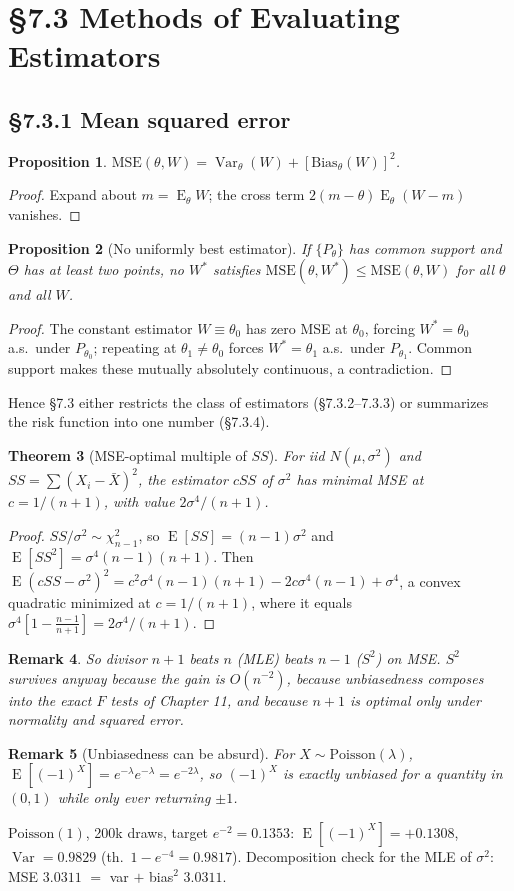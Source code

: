 \documentclass[11pt]{article}
\newtheorem{theorem}{Theorem}[section]
\newtheorem{remark}[theorem]{Remark}
\newtheorem{proposition}[theorem]{Proposition}
\DeclareMathOperator{\Var}{Var}\DeclareMathOperator{\Cov}{Cov}\DeclareMathOperator{\E}{E}
\newcommand{\MSE}{\mathrm{MSE}}
\begin{document}
\section{\S7.3 Methods of Evaluating Estimators}
\subsection{\S7.3.1 Mean squared error}
\begin{proposition}
$\MSE(\theta,W)=\Var_\theta(W)+[\mathrm{Bias}_\theta(W)]^2$.
\end{proposition}
\begin{proof}
Expand about $m=\E_\theta W$; the cross term $2(m-\theta)\E_\theta(W-m)$ vanishes.
\end{proof}
\begin{proposition}[No uniformly best estimator]
If $\{P_\theta\}$ has common support and $\Theta$ has at least two points, no $W^*$ satisfies $\MSE(\theta,W^*)\le\MSE(\theta,W)$ for all $\theta$ and all $W$.
\end{proposition}
\begin{proof}
The constant estimator $W\equiv\theta_0$ has zero MSE at $\theta_0$, forcing $W^*=\theta_0$ a.s.\ under $P_{\theta_0}$; repeating at $\theta_1\ne\theta_0$ forces $W^*=\theta_1$ a.s.\ under $P_{\theta_1}$. Common support makes these mutually absolutely continuous, a contradiction.
\end{proof}
Hence \S7.3 either restricts the class of estimators (\S7.3.2--7.3.3) or summarizes the risk function into one number (\S7.3.4).
\begin{theorem}[MSE-optimal multiple of $SS$]
For iid $N(\mu,\sigma^2)$ and $SS=\sum(X_i-\bar X)^2$, the estimator $cSS$ of $\sigma^2$ has minimal MSE at $c=1/(n+1)$, with value $2\sigma^4/(n+1)$.
\end{theorem}
\begin{proof}
$SS/\sigma^2\sim\chi^2_{n-1}$, so $\E[SS]=(n-1)\sigma^2$ and $\E[SS^2]=\sigma^4(n-1)(n+1)$. Then $\E(cSS-\sigma^2)^2=c^2\sigma^4(n-1)(n+1)-2c\sigma^4(n-1)+\sigma^4$, a convex quadratic minimized at $c=1/(n+1)$, where it equals $\sigma^4[1-\frac{n-1}{n+1}]=2\sigma^4/(n+1)$.
\end{proof}
\begin{remark}
So divisor $n+1$ beats $n$ (MLE) beats $n-1$ ($S^2$) on MSE. $S^2$ survives anyway because the gain is $O(n^{-2})$, because unbiasedness composes into the exact $F$ tests of Chapter 11, and because $n+1$ is optimal only under normality and squared error.
\end{remark}
\begin{remark}[Unbiasedness can be absurd]
For $X\sim\mathrm{Poisson}(\lambda)$, $\E[(-1)^X]=e^{-\lambda}e^{-\lambda}=e^{-2\lambda}$, so $(-1)^X$ is exactly unbiased for a quantity in $(0,1)$ while only ever returning $\pm1$.
\end{remark}
\begin{simbox}
$\mathrm{Poisson}(1)$, 200k draws, target $e^{-2}=0.1353$: $\E[(-1)^X]=+0.1308$, $\Var=0.9829$ (th.\ $1-e^{-4}=0.9817$). Decomposition check for the MLE of $\sigma^2$: MSE $3.0311$ $=$ var $+$ bias$^2$ $3.0311$.
\end{simbox}
\end{document}
